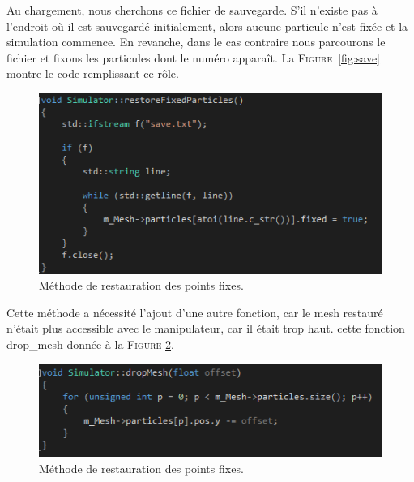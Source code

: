 \documentclass[a4paper,12pt]{article}
\begin{document}
Au chargement, nous cherchons ce fichier de sauvegarde. S'il n'existe pas à l'endroit où il est sauvegardé initialement, alors aucune particule n'est fixée et la simulation commence. En revanche, dans le cas contraire nous parcourons le fichier et fixons les particules dont le numéro apparaît. La \textsc{Figure}~\ref{fig:save} montre le code remplissant ce rôle.
\begin{figure}
  \centering
  \includegraphics{images/restore.png}
  \caption{Méthode de restauration des points fixes.}
  \label{fig:restore}
\end{figure}

Cette méthode a nécessité l'ajout d'une autre fonction, car le mesh restauré n'était plus accessible avec le manipulateur, car il était trop haut. cette fonction \og{}drop_mesh\fg{} donnée à la \textsc{Figure} \ref{fig:drop}.
\begin{figure}
  \centering
  \includegraphics{images/drop.png}
  \caption{Méthode de restauration des points fixes.}
  \label{fig:drop}
\end{figure}
\end{document}
